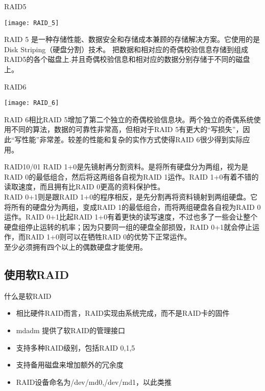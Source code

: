 %
%
%
%


\begin{frame}{RAID5}

\texttt{[image: RAID\_5]}


RAID 5 是一种存储性能、数据安全和存储成本兼顾的存储解决方案。它使用的是Disk Striping（硬盘分割）技术。 把数据和相对应的奇偶校验信息存储到组成RAID5的各个磁盘上.并且奇偶校验信息和相对应的数据分别存储于不同的磁盘上。


\end{frame}

\begin{frame}{RAID6}

\texttt{[image: RAID\_6]}


RAID 6相比RAID 5增加了第二个独立的奇偶校验信息块。两个独立的奇偶系统使用不同的算法，数据的可靠性非常高，但相对于RAID 5有更大的“写损失”，因此“写性能”非常差。较差的性能和复杂的实作方式使得RAID 6很少得到实际应用。


\end{frame}

\begin{frame}{RAID10/01}
RAID 1+0是先镜射再分割资料。是将所有硬盘分为两组，视为是RAID 0的最低组合，然后将这两组各自视为RAID 1运作。RAID 1+0有着不错的读取速度，而且拥有比RAID 0更高的资料保护性。 \\
RAID 0+1则是跟RAID 1+0的程序相反，是先分割再将资料镜射到两组硬盘。它将所有的硬盘分为两组，变成RAID 1的最低组合，而将两组硬盘各自视为RAID 0运作。RAID 0+1比起RAID 1+0有着更快的读写速度，不过也多了一些会让整个硬盘组停止运转的机率；因为只要同一组的硬盘全部损毁，RAID 0+1就会停止运作，而RAID 1+0则可以在牺牲RAID 0的优势下正常运作。 \\
至少必须拥有四个以上的偶数硬盘才能使用。
\end{frame}
\subsection{使用软RAID}

\begin{frame}{什么是软RAID}
\begin{itemize}
\item 相比硬件RAID而言，RAID实现由系统完成，而不是RAID卡的固件
\item mdadm 提供了软RAID的管理接口
\item 支持多种RAID级别，包括RAID 0,1,5
\item 支持备用磁盘来增加额外的冗余度
\item RAID设备命名为/dev/md0,/dev/md1，以此类推
\end{itemize}

\end{frame} 

